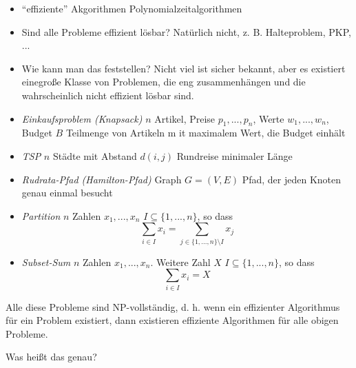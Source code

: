 \begin{itemize}
 \item "`effiziente"' Akgorithmen Polynomialzeitalgorithmen
 \item Sind alle Probleme effizient lösbar? Natürlich nicht, z. B. Halteproblem, PKP, ...
 \item Wie kann man das feststellen? Nicht viel ist sicher bekannt, aber es existiert einegroße Klasse von Problemen, die eng zusammenhängen und die wahrscheinlich nicht effizient lösbar sind.
\end{itemize}
\Bsp
\begin{itemize}
\item   \emph{Einkaufsproblem (Knapsack)}
        \Geg $n$ Artikel, Preise $p_1, ..., p_n$, Werte $w_1, ..., w_n$, Budget $B$
        \Ges Teilmenge von Artikeln m it maximalem Wert, die Budget einhält
\item   \emph{TSP}
        \Geg $n$ Städte mit Abstand $d(i,j)$
        \Ges Rundreise minimaler Länge
\item   \emph{Rudrata-Pfad (Hamilton-Pfad)}
        \Geg Graph $G = (V,E)$
        \Ges Pfad, der jeden Knoten genau einmal besucht
\item   \emph{Partition}
        \Geg $n$ Zahlen $x_1,...,x_n$
        \Ges $I \subseteq \{1, ..., n\}$, so dass
            \[\sum\limits_{i \in I} x_i = \sum\limits_{j \in \{1, ..., n\} \setminus I} x_j\]
\item   \emph{Subset-Sum}
        \Geg $n$ Zahlen $x_1,...,x_n$. Weitere Zahl $X$
        \Ges $I \subseteq \{1, ..., n\}$, so dass
            \[\sum\limits_{i \in I} x_i = X\]
\end{itemize}
Alle diese Probleme sind NP-vollständig, d. h. wenn ein effizienter Algorithmus für ein Problem existiert, dann existieren effiziente Algorithmen für alle obigen Probleme.
\par Was heißt das genau?
